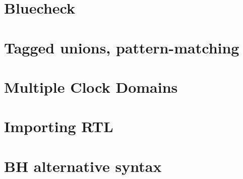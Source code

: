 \section{Bluecheck}

\section{Tagged unions, pattern-matching}

\section{Multiple Clock Domains}

\section{Importing RTL}

\section{BH alternative syntax}

